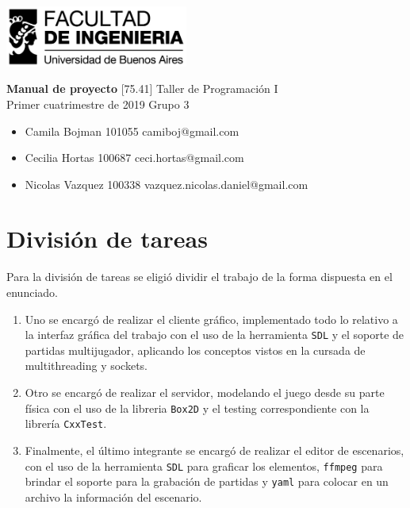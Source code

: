 \documentclass[a4paper]{article}
\newcommand{\materia}{[75.41] Taller de Programación I}
\newcommand{\trabajo}{Manual de proyecto}
\newcommand{\cuatrimestre}{Primer cuatrimestre de 2019}
\newcommand{\grupo}{Grupo 3}
\begin{document}
	\setcounter{page}{1}
	
	\begin{titlepage}
		\hfill\includegraphics[width=6cm]{fiuba.jpeg}
		\begin{center}
			\vfill
			\Huge \textbf{\trabajo}
			\vskip2cm
			\Large \materia\\
			\cuatrimestre
			\vfill
			\grupo
			\begin{itemize}
				\item Camila Bojman 101055 camiboj@gmail.com
				\item Cecilia Hortas 100687 ceci.hortas@gmail.com 
				\item Nicolas Vazquez 100338 vazquez.nicolas.daniel@gmail.com
			\end{itemize}
			\vskip1cm
		\end{center}
	\end{titlepage}

\section{División de tareas}

Para la división de tareas se eligió dividir el trabajo de la forma dispuesta en el enunciado.
\begin{enumerate}
	\item Uno se encargó de realizar el cliente gráfico, implementado todo lo relativo a la interfaz gráfica del trabajo con el uso de la herramienta \texttt{SDL} y el soporte de partidas multijugador, aplicando los conceptos vistos en la cursada de multithreading y sockets.
	\item Otro se encargó de realizar el servidor, modelando el juego desde su parte física con el uso de la libreria \texttt{Box2D} y el testing correspondiente con la librería \texttt{CxxTest}.
	\item Finalmente, el último integrante se encargó de realizar el editor de escenarios, con el uso de la herramienta \texttt{SDL} para graficar los elementos,  \texttt{ffmpeg} para brindar el soporte para la grabación de partidas y \texttt{yaml} para colocar en un archivo la información del escenario.
\end{enumerate}
\end{document}
